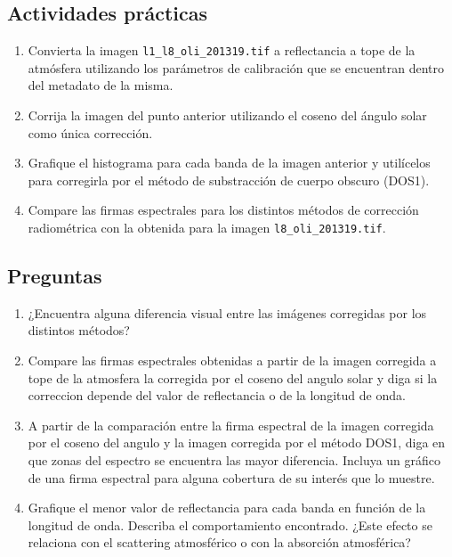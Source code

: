 \documentclass[hidelinks,12pt]{article}
\begin{document}
\subsection{Actividades pr\'acticas}
\begin{enumerate}
    \item Convierta la imagen  \texttt{l1\_l8\_oli\_2013\-19.tif} a reflectancia a 
        tope de la atmósfera utilizando los parámetros de calibración que se 
        encuentran dentro del metadato de la misma.
    \item Corrija la imagen del punto anterior utilizando el coseno del ángulo solar 
        como única corrección.
    \item Grafique el histograma para cada banda de la imagen anterior y utilícelos 
        para corregirla por el método de substracción de cuerpo obscuro (DOS1).
    \item Compare las firmas espectrales para los distintos métodos de
        corrección radiométrica con la obtenida para la imagen 
        \texttt{l8\_oli\_2013\-19.tif}.
\end{enumerate}

\subsection{Preguntas}
\begin{enumerate}
    \item ¿Encuentra alguna diferencia visual entre las imágenes corregidas por los
        distintos métodos?
    \item Compare las firmas espectrales obtenidas a partir de la imagen
        corregida a tope de la atmosfera  la corregida por el coseno del angulo
        solar y diga si la correccion depende del valor de reflectancia o de la
        longitud de onda.
    \item A partir de la comparación entre la firma espectral de la imagen
        corregida por el coseno del angulo y la imagen corregida por el método DOS1, 
        diga en que zonas del espectro se encuentra las mayor diferencia. Incluya 
        un gráfico de una firma espectral para alguna cobertura de su interés que 
        lo muestre.
    \item Grafique el menor valor de reflectancia para cada banda en función de la
        longitud de onda. Describa el comportamiento encontrado. ¿Este efecto se
        relaciona con el scattering atmosférico o con la absorción atmosférica?
\end{enumerate}
\newpage
\end{document}
